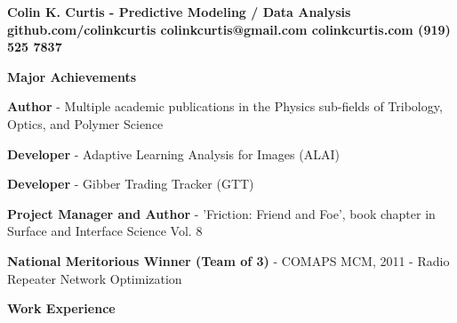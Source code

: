 \documentclass[letterpaper,final]{memoir}
\newcommand{\LargeSep}{\vspace{1.3em}}
\newcommand{\Sep}{\vspace{1.0em}}
\newcommand{\SmallSep}{\vspace{0.4em}}
\newcommand{\CVSection}[1]
	{\LARGE\textbf{#1}\par
	\SmallSep\normalsize}
\newcommand\tab[1][1cm]{\hspace*{#1}}
\begin{document}
\Huge \bfseries {\color{Blue} Colin K. Curtis - Predictive Modeling / Data Analysis} \\



\normalsize \bfseries \tab github.com/colinkcurtis \tab colinkcurtis@gmail.com  \tab colinkcurtis.com \tab  (919) 525 7837 \\


\normalsize\normalfont



\notoserif \CVSection{Major Achievements}
\normalfont

\Sep

\begin{compactitem}
    
    \item \textbf{Author} - Multiple academic publications in the Physics sub-fields of Tribology, Optics, and Polymer Science
    \SmallSep

    \item \textbf{Developer} - Adaptive Learning Analysis for Images (ALAI) 
    \SmallSep
    
    \item \textbf{Developer} - Gibber Trading Tracker (GTT)
    \SmallSep

    \item \textbf{Project Manager and Author} - 'Friction: Friend and Foe', book chapter in Surface and Interface Science Vol. 8
    \SmallSep
    
    \item \textbf{National Meritorious Winner (Team of 3)} - COMAPS MCM, 2011 - Radio Repeater Network Optimization
	
	
\end{compactitem}

\LargeSep



\notoserif \CVSection{Work Experience}
\normalfont

\Sep
\end{document}
